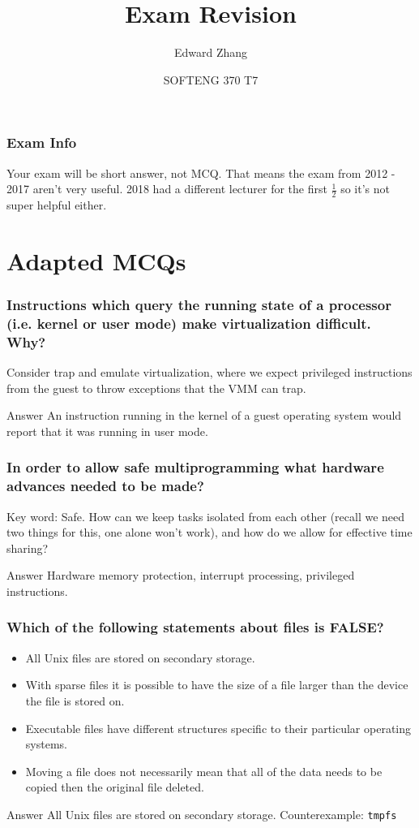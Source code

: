 \documentclass{beamer}
\title[SOFTENG 370 Tutorial 7 (2019)] %
{Exam Revision}
\author{Edward Zhang}
\date[October 2019] %
{SOFTENG 370 T7}
\begin{document}
\frame{\titlepage}
\begin{frame}
  \frametitle{Exam Info}
  Your exam will be short answer, not MCQ. That means the exam from 2012 - 2017 aren't very useful. 2018 had a different lecturer for the first $\frac{1}{2}$ so it's not super helpful either.\\
\end{frame}
\section{Adapted MCQs}
\begin{frame}
  \frametitle{Instructions which query the running state of a processor (i.e. kernel or user mode) make virtualization difficult. Why?}
  \pause
  Consider trap and emulate virtualization, where we expect privileged instructions from the guest to throw exceptions that the VMM can trap.
  \pause
  \begin{block}{Answer}
    An instruction running in the kernel of a guest operating system would report that it was running in user mode.
  \end{block}
\end{frame}
\begin{frame}
  \frametitle{In order to allow safe multiprogramming what hardware advances needed to be made?}
  \pause
  Key word: Safe. How can we keep tasks isolated from each other (recall we need two things for this, one alone won't work), and how do we allow for effective time sharing?
  \pause
  \begin{block}{Answer}
    Hardware memory protection, interrupt processing, privileged instructions.
  \end{block}
\end{frame}
\begin{frame}
  \frametitle{Which of the following statements about files is FALSE?}
  \begin{itemize}
    \item All Unix files are stored on secondary storage.
    \item With sparse files it is possible to have the size of a file larger than the device the file is stored on.
    \item Executable files have different structures specific to their particular operating systems.
    \item Moving a file does not necessarily mean that all of the data needs to be copied then the original file deleted.
  \end{itemize}
  \pause
  \begin{block}{Answer}
    All Unix files are stored on secondary storage. Counterexample: \texttt{tmpfs}
  \end{block}
\end{frame}
\end{document}
